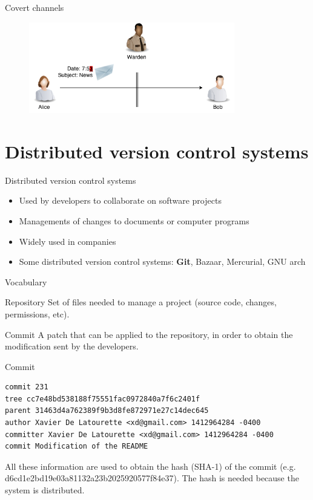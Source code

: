 \documentclass[11pt, compress]{beamer}
\begin{document}
\begin{frame}{Covert channels}
\begin{figure}
  \centering
    \includegraphics[width=0.8\textwidth]{images/covert_channel_2.png}
  \label{fig:covert_channel_2}
\end{figure}
\end{frame}


\section{Distributed version control systems}

\begin{frame}{Distributed version control systems}

\begin{itemize}
\item Used by developers to collaborate on software projects
\medskip
\item Managements of changes to documents or computer programs
\medskip
\item Widely used in companies
\medskip
\item Some distributed version control systems: \textbf{Git}, Bazaar, Mercurial, GNU arch
\end{itemize}

\end{frame}

\begin{frame}{Vocabulary}
\vfill
\begin{block}{Repository}
Set of files needed to manage a project (source code, changes, permissions, etc).
\end{block}
\vfill
\begin{block}{Commit}
A patch that can be applied to the repository, in order to obtain the modification sent by the developers.
\end{block}
\vfill
\end{frame}

\begin{frame}[fragile]{Commit}
\vfill
  \begin{lstlisting}[frame=single, breaklines=true, basicstyle=\small]
commit 231
tree cc7e48bd538188f75551fac0972840a7f6c2401f
parent 31463d4a762389f9b3d8fe872971e27c14dec645
author Xavier De Latourette <xd@gmail.com> 1412964284 -0400
committer Xavier De Latourette <xd@gmail.com> 1412964284 -0400
commit Modification of the README
  \end{lstlisting}
  \vfill
  All these information are used to obtain the hash (SHA-1) of the commit (e.g. d6cd1e2bd19e03a81132a23b2025920577f84e37).
The hash is needed because the system is distributed.
\end{frame}
\end{document}
